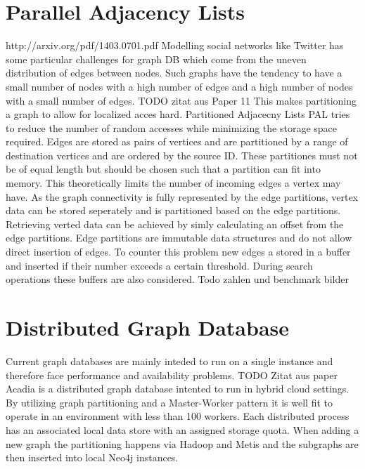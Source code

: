 \documentclass{sig-alternate}
\begin{document}
\section{Parallel Adjacency Lists}
http://arxiv.org/pdf/1403.0701.pdf
Modelling social networks like Twitter has some particular challenges
for graph DB which come from the uneven distribution of edges between nodes.
Such graphs have the tendency to have a small number of nodes with a high number of edges
and a high number of nodes with a small number of edges. TODO zitat aus Paper 11
This makes partitioning a graph to allow for localized acces hard.
Partitioned Adjacecny Lists PAL tries to reduce the number of random accesses while minimizing the storage
space required. Edges are stored as pairs of vertices and are partitioned by a range of destination
vertices and are ordered by the source ID. These partitiones must not be of equal length but should 
be chosen such that a partition can fit into memory. This theoretically limits the number of
incoming edges a vertex may have.
As the graph connectivity is fully represented 
by the edge partitions, vertex data can be stored seperately and is partitioned 
based on the edge partitions. Retrieving verted data can be achieved by simly calculating an offset from
the edge partitions.
Edge partitions are immutable data structures and do not allow direct insertion of edges. 
To counter this problem new edges a stored in a buffer and inserted if their number exceeds a certain threshold.
During search operations these buffers are also considered.
Todo zahlen und benchmark bilder

\section{Distributed Graph Database}
Current graph databases are mainly inteded to run on a single instance and therefore
face performance and availability problems. TODO Zitat aus paper 
Acadia is a distributed graph database intented to run in hybrid cloud settings.
By utilizing graph partitioning and a Master-Worker pattern it is well fit to 
operate in an environment with less than 100 workers.
Each distributed process has an associated local data store with an assigned storage quota.
When adding a new graph the partitioning happens via Hadoop and Metis and the subgraphs are then inserted into local
Neo4j instances.
\end{document}
